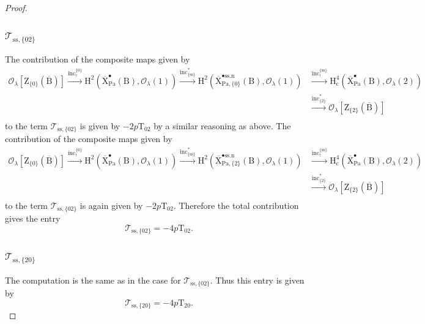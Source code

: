 \documentclass[10pt]{amsart}
\numberwithin{equation}{section}
\theoremstyle{definition}
\def\Pa{\mathrm{Pa}}
\def\calO{\mathcal{O}}
\def\calT{\mathcal{T}}
\def\rmc{\mathrm{c}}
\def\rmB{\mathrm{B}}
\def\rmH{\mathrm{H}}
\def\rmX{\mathrm{X}}
\def\rmZ{\mathrm{Z}}
\begin{document}
\begin{proof}
\subsubsection{$\calT_{\mathrm{ss},\{02\}}$} The contribution of the composite maps given by
\begin{equation*}
\begin{aligned}
\calO_{\lambda}[\rmZ_{\{0\}}(\overline{\rmB})]\xrightarrow{\mathrm{inc}^{\{0\}}_{!}}\rmH^{2}(\overline{\rmX}^{\bullet}_{\Pa}(\rmB), \calO_{\lambda}(1))\xrightarrow{\mathrm{inc}^{\ast}_{\{\mathrm{ss}\}}}\rmH^{2}(\overline{\rmX}^{\bullet\mathrm{ss.n}}_{\Pa, \{0\}}(\rmB), \calO_{\lambda}(1))&\xrightarrow{\mathrm{inc}^{\{\mathrm{ss}\}}_{!}} \rmH^{4}_{\rmc}(\overline{\rmX}^{\bullet}_{\Pa}(\rmB), \calO_{\lambda}(2))\\
&\xrightarrow{\mathrm{inc}^{\ast}_{\{2\}}}\calO_{\lambda}[\rmZ_{\{2\}}(\overline{\rmB})]\\
\end{aligned}
\end{equation*}
to the term $\calT_{\mathrm{ss},\{02\}}$ is given by $-2p\mathrm{T}_{02}$ by a similar reasoning as above. The contribution of the composite maps given by
\begin{equation*}
\begin{aligned}
\calO_{\lambda}[\rmZ_{\{0\}}(\overline{\rmB})]\xrightarrow{\mathrm{inc}^{\{0\}}_{!}}\rmH^{2}(\overline{\rmX}^{\bullet}_{\Pa}(\rmB), \calO_{\lambda}(1))\xrightarrow{\mathrm{inc}^{\ast}_{\{\mathrm{ss}\}}}\rmH^{2}(\overline{\rmX}^{\bullet\mathrm{ss.n}}_{\Pa, \{2\}}(\rmB), \calO_{\lambda}(1))&\xrightarrow{\mathrm{inc}^{\{\mathrm{ss}\}}_{!}} \rmH^{4}_{\rmc}(\overline{\rmX}^{\bullet}_{\Pa}(\rmB), \calO_{\lambda}(2))\\
&\xrightarrow{\mathrm{inc}^{\ast}_{\{2\}}}\calO_{\lambda}[\rmZ_{\{2\}}(\overline{\rmB})]\\
\end{aligned}
\end{equation*}
to the term $\calT_{\mathrm{ss},\{02\}}$ is again given by $-2p\mathrm{T}_{02}$. Therefore the total contribution gives the entry 
\begin{equation*}
\calT_{\mathrm{ss},\{02\}}=-4p\mathrm{T}_{02}.
\end{equation*}
\subsubsection{$\calT_{\mathrm{ss},\{20\}}$} The computation is the same as in the case for $\calT_{\mathrm{ss},\{02\}}$. Thus this entry is given by 
\begin{equation*}
\calT_{\mathrm{ss},\{20\}}=-4p\mathrm{T}_{20}.
\end{equation*}


\end{proof}
\end{document}
